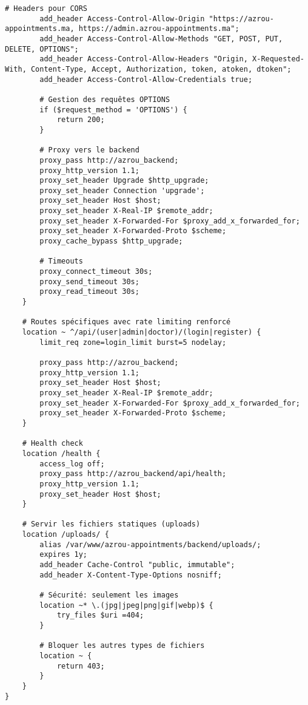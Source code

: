 \begin{lstlisting}[caption=nginx.conf - Configuration Nginx complète]
        # Headers pour CORS
        add_header Access-Control-Allow-Origin "https://azrou-appointments.ma, https://admin.azrou-appointments.ma";
        add_header Access-Control-Allow-Methods "GET, POST, PUT, DELETE, OPTIONS";
        add_header Access-Control-Allow-Headers "Origin, X-Requested-With, Content-Type, Accept, Authorization, token, atoken, dtoken";
        add_header Access-Control-Allow-Credentials true;
        
        # Gestion des requêtes OPTIONS
        if ($request_method = 'OPTIONS') {
            return 200;
        }
        
        # Proxy vers le backend
        proxy_pass http://azrou_backend;
        proxy_http_version 1.1;
        proxy_set_header Upgrade $http_upgrade;
        proxy_set_header Connection 'upgrade';
        proxy_set_header Host $host;
        proxy_set_header X-Real-IP $remote_addr;
        proxy_set_header X-Forwarded-For $proxy_add_x_forwarded_for;
        proxy_set_header X-Forwarded-Proto $scheme;
        proxy_cache_bypass $http_upgrade;
        
        # Timeouts
        proxy_connect_timeout 30s;
        proxy_send_timeout 30s;
        proxy_read_timeout 30s;
    }
    
    # Routes spécifiques avec rate limiting renforcé
    location ~ ^/api/(user|admin|doctor)/(login|register) {
        limit_req zone=login_limit burst=5 nodelay;
        
        proxy_pass http://azrou_backend;
        proxy_http_version 1.1;
        proxy_set_header Host $host;
        proxy_set_header X-Real-IP $remote_addr;
        proxy_set_header X-Forwarded-For $proxy_add_x_forwarded_for;
        proxy_set_header X-Forwarded-Proto $scheme;
    }
    
    # Health check
    location /health {
        access_log off;
        proxy_pass http://azrou_backend/api/health;
        proxy_http_version 1.1;
        proxy_set_header Host $host;
    }
    
    # Servir les fichiers statiques (uploads)
    location /uploads/ {
        alias /var/www/azrou-appointments/backend/uploads/;
        expires 1y;
        add_header Cache-Control "public, immutable";
        add_header X-Content-Type-Options nosniff;
        
        # Sécurité: seulement les images
        location ~* \.(jpg|jpeg|png|gif|webp)$ {
            try_files $uri =404;
        }
        
        # Bloquer les autres types de fichiers
        location ~ {
            return 403;
        }
    }
}


\end{lstlisting}
